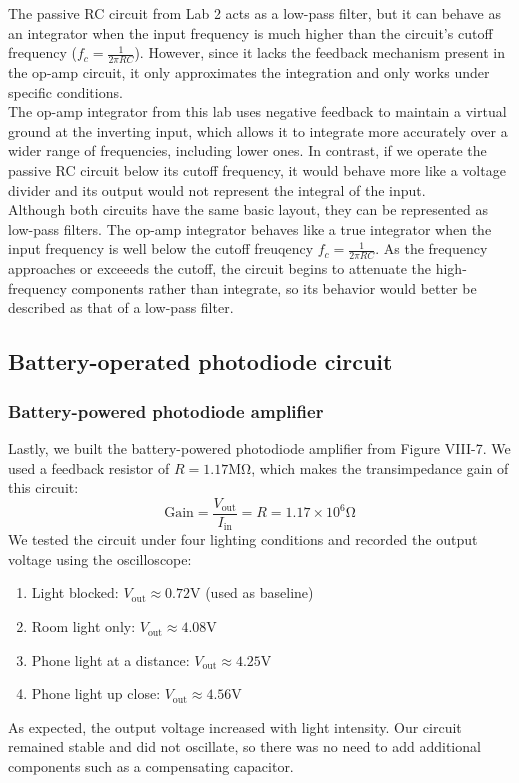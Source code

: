\documentclass{article}
\begin{document}
\noindent The passive RC circuit from Lab 2 acts as a low-pass filter, but it
can behave as an integrator when the input frequency is much higher than the
circuit's cutoff frequency ($f_c=\frac{1}{2\pi RC}$). However, since it lacks
the feedback mechanism present in the op-amp circuit, it only approximates the
integration and only works under specific conditions.\\

\noindent The op-amp integrator from this lab uses negative feedback to maintain
a virtual ground at the inverting input, which allows it to integrate more 
accurately over a wider range of frequencies, including lower ones. In contrast,
if we operate the passive RC circuit below its cutoff frequency, it would behave
more like a voltage divider and its output would not represent the integral of
the input.\\

\noindent Although both circuits have the same basic layout, they can be
represented as low-pass filters. The op-amp integrator behaves like a true
integrator when the input frequency is well below the cutoff freuqency
$f_c=\frac{1}{2\pi RC}$. As the frequency approaches or exceeeds the cutoff,
the circuit begins to attenuate the high-frequency components rather than
integrate, so its behavior would better be described as that of a low-pass
filter.

\subsection{Battery-operated photodiode circuit}

\subsubsection{Battery-powered photodiode amplifier}

Lastly, we built the battery-powered photodiode amplifier from Figure VIII-7.
We used a feedback resistor of $R=1.17\si{\mega\ohm}$, which makes the 
transimpedance gain of this circuit:
\begin{equation}
    \text{Gain}=\frac{V_\text{out}}{I_\text{in}}=R=1.17\times 10^6\si{\ohm}
\end{equation}
\noindent We tested the circuit under four lighting conditions and recorded
the output voltage using the oscilloscope:
\begin{enumerate}
    \item Light blocked: $V_\text{out}\approx0.72\si{\volt}$ (used as baseline)
    \item Room light only: $V_\text{out}\approx4.08\si{\volt}$
    \item Phone light at a distance: $V_\text{out}\approx 4.25\si{\volt}$
    \item Phone light up close: $V_\text{out}\approx4.56\si{\volt}$
\end{enumerate}
\noindent As expected, the output voltage increased with light intensity. Our
circuit remained stable and did not oscillate, so there was no need to add
additional components such as a compensating capacitor.
\end{document}
